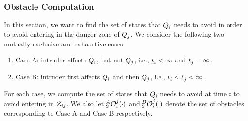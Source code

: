 \subsubsection{Obstacle Computation} \label{sec:intruderObs_case2}
In this section, we want to find the set of states that $Q_i$ needs to avoid in order to avoid entering in the danger zone of $Q_j$. We consider the following two mutually exclusive and exhaustive cases:
\begin{enumerate}
\item Case A: intruder affects $Q_i$, but not $Q_j$, i.e., $\underline{t}_i < \infty$ and $\underline{t}_j = \infty$.
\item Case B: intruder first affects $Q_i$ and then $Q_j$, i.e., $\underline{t}_i < \underline{t}_j < \infty$.
\end{enumerate}
For each case, we compute the set of states that $Q_i$ needs to avoid at time $t$ to avoid entering in $\mathcal{Z}_{ij}$. We also let $_2^A\mathcal{O}_i^j(\cdot)$ and $_2^B\mathcal{O}_i^j(\cdot)$ denote the set of obstacles corresponding to Case A and Case B respectively. 
